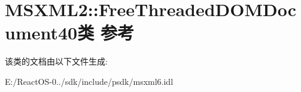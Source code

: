 \hypertarget{class_m_s_x_m_l2_1_1_free_threaded_d_o_m_document40}{}\section{M\+S\+X\+M\+L2\+:\+:Free\+Threaded\+D\+O\+M\+Document40类 参考}
\label{class_m_s_x_m_l2_1_1_free_threaded_d_o_m_document40}


该类的文档由以下文件生成\+:\begin{DoxyCompactItemize}
\item 
E\+:/\+React\+O\+S-\/0../sdk/include/psdk/msxml6.\+idl\end{DoxyCompactItemize}

